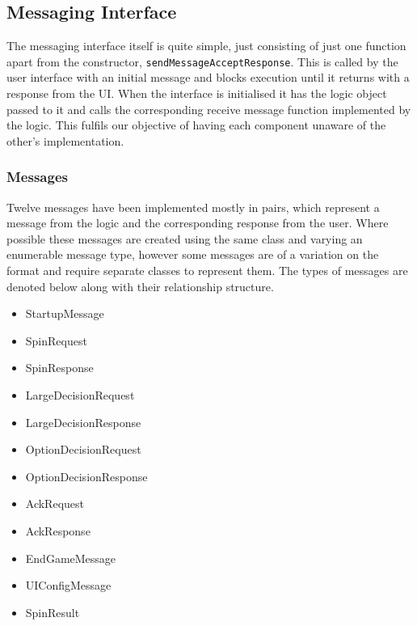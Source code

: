 \documentclass[a4paper, 11pt]{article}
\begin{document}
	\subsection*{Messaging Interface}
	The messaging interface itself is quite simple, just consisting of just one function apart from the constructor, \texttt{sendMessageAcceptResponse}. This is called by the user interface with an initial message and blocks execution until it returns with a response from the UI. When the interface is initialised it has the logic object passed to it and calls the corresponding receive message function implemented by the logic. This fulfils our objective of having each component unaware of the other's implementation. %
	
	\subsubsection*{Messages}
	Twelve messages have been implemented mostly in pairs, which represent a message from the logic and the corresponding response from the user. Where possible these messages are created using the same class and varying an enumerable message type, however some messages are of a variation on the format and require separate classes to represent them. The types of messages are denoted below along with their relationship structure.
	\begin{itemize} %
		\item StartupMessage\\
		\item SpinRequest\\
		\item SpinResponse\\
		\item LargeDecisionRequest\\
		\item LargeDecisionResponse\\
		\item OptionDecisionRequest\\
		\item OptionDecisionResponse\\
		\item AckRequest\\
		\item AckResponse\\
		\item EndGameMessage\\
		\item UIConfigMessage\\
		\item SpinResult\\	
	\end{itemize}
\end{document}
